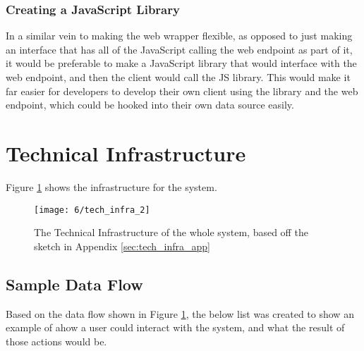 \documentclass[../dissertation.tex]{subfiles}
\begin{document}
\subsubsection{Creating a JavaScript Library}
In a similar vein to making the web wrapper flexible, as opposed to just making an interface that has all of the JavaScript calling the web endpoint as part of it, it would be preferable to make a JavaScript library that would interface with the web endpoint, and then the client would call the JS library. This would make it far easier for developers to develop their own client using the library and the web endpoint, which could be hooked into their own data source easily.

\section{Technical Infrastructure}

Figure \ref{fig:techinfra} shows the infrastructure for the system.

\begin{figure}[H]
    \centering
    \texttt{[image: 6/tech\_infra\_2]}
    \caption{The Technical Infrastructure of the whole system, based off the sketch in Appendix \ref{sec:tech_infra_app}}
    \label{fig:techinfra}
\end{figure}

\subsection{Sample Data Flow}

Based on the data flow shown in Figure \ref{fig:techinfra}, the below list was created to show an example of ahow a user could interact with the system, and what the result of those actions would be.
\end{document}
